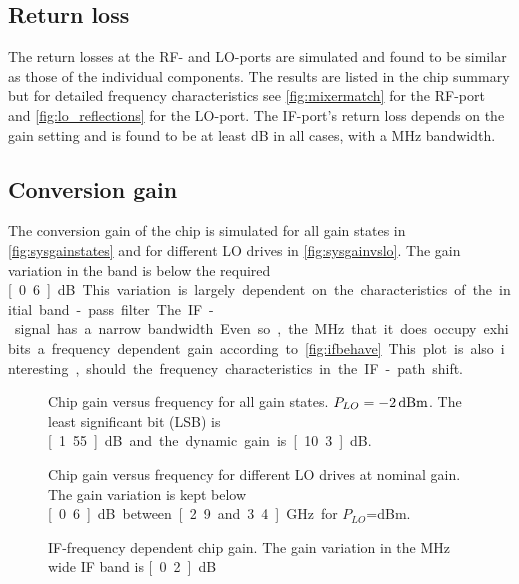 		\subsection{Return loss}
			The return losses at the RF- and LO-ports are simulated and found to be similar as those of the individual components. The results are listed in the chip summary but for detailed frequency characteristics see \autoref{fig:mixermatch} for the RF-port and \autoref{fig:lo_reflections} for the LO-port. The IF-port's return loss depends on the gain setting and is found to be at least \unit[21]{dB} in all cases, with a \unit[100]{MHz} bandwidth.

		\subsection{Conversion gain}
			The conversion gain of the chip is simulated for all gain states in \autoref{fig:sysgainstates} and for different LO drives in \autoref{fig:sysgainvslo}. The gain variation in the band is below the required \unit[0.6]{dB}. This variation is largely dependent on the characteristics of the initial band-pass filter.

			The IF-signal has a narrow bandwidth. Even so, the \unit[20]{MHz} that it does occupy exhibits a frequency dependent gain according to \autoref{fig:ifbehave}. This plot is also interesting, should the frequency characteristics in the IF-path shift.

			\begin{figure}[hbt!]
				\centering
				\caption[Chip gain for all gain states.]{Chip gain versus frequency for all gain states. $P_{LO}=\unit[-2]{dBm}$. The least significant bit (LSB) is \unit[1.55]{dB} and the dynamic gain is \unit[10.3]{dB}.}\label{fig:sysgainstates}
			\end{figure}

			\begin{figure}[hbt!]
				\centering
				\caption[Chip gain for different LO drives.]{Chip gain versus frequency for different LO drives at nominal gain. The gain variation is kept below \unit[0.6]{dB} between \unit[2.9 and 3.4]{GHz} for $P_{LO}$=\unit[-4 to 0]{dBm}.}\label{fig:sysgainvslo}
			\end{figure}

			\begin{figure}[hbt!]
				\centering
				\caption[IF-frequency dependent chip gain.]{IF-frequency dependent chip gain. The gain variation in the \unit[20]{MHz} wide IF band is \unit[0.2]{dB}}\label{fig:ifbehave}
			\end{figure}

